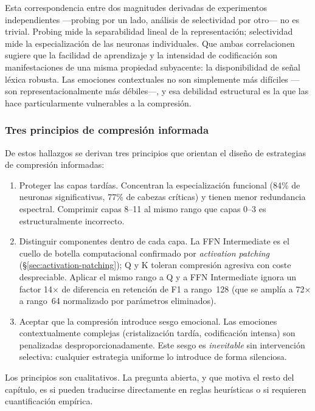 Esta correspondencia entre dos magnitudes derivadas de experimentos
independientes ---probing por un lado, análisis de selectividad por
otro--- no es trivial. Probing mide la separabilidad lineal de la
representación; selectividad mide la especialización de las neuronas
individuales. Que ambas correlacionen sugiere que la facilidad de
aprendizaje y la intensidad de codificación son manifestaciones de una
misma propiedad subyacente: la disponibilidad de señal léxica robusta.
Las emociones contextuales no son simplemente más difíciles ---son
representacionalmente más débiles---, y esa debilidad estructural es
la que las hace particularmente vulnerables a la compresión.

\subsubsection{Tres principios de compresión informada}

De estos hallazgos se derivan tres principios que orientan el diseño de
estrategias de compresión informadas:

\begin{enumerate}
    \item Proteger las capas tardías. Concentran la
    especialización funcional (84\% de neuronas significativas, 77\% de
    cabezas críticas) y tienen menor redundancia espectral. Comprimir
    capas 8--11 al mismo rango que capas 0--3 es estructuralmente
    incorrecto.

    \item Distinguir componentes dentro de cada capa. La FFN
    Intermediate es el cuello de botella computacional confirmado por
    \emph{activation patching} (\S\ref{sec:activation-patching}); Q y K toleran
    compresión agresiva con coste despreciable. Aplicar el mismo rango a
    Q y a FFN Intermediate ignora un factor 14$\times$ de diferencia en
    retención de F1 a rango~128 (que se amplía a 72$\times$ a rango~64
    normalizado por parámetros eliminados).

    \item Aceptar que la compresión introduce sesgo emocional.
    Las emociones contextualmente complejas (cristalización tardía,
    codificación intensa) son penalizadas desproporcionadamente. Este
    sesgo es \emph{inevitable} sin intervención selectiva: cualquier
    estrategia uniforme lo introduce de forma silenciosa.
\end{enumerate}

Los principios son cualitativos. La pregunta abierta, y que motiva el
resto del capítulo, es si pueden traducirse directamente en reglas
heurísticas o si requieren cuantificación empírica.


